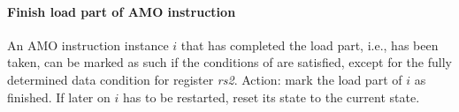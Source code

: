 \paragraph{Finish load part of AMO instruction}\label{omm:hart:finish_load_part}
An AMO instruction instance $i$ that has completed the load part, i.e.,  has been taken, can be marked as such if the conditions of  are satisfied, except for the fully determined data condition for register {\em rs2}.
Action: mark the load part of $i$ as finished. If later on $i$ has to be restarted, reset its state to the current state.


%
%
